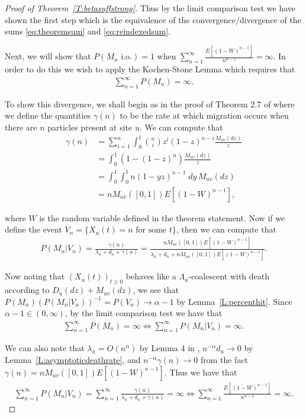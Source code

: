 \documentclass[11pt]{article}
\theoremstyle{definition}
\newcommand{\thmref}[1]{Theorem~\ref{T:#1}}
\newcommand{\lemref}[1]{Lemma~\ref{L:#1}}
\begin{document}
\begin{proof}[Proof of \thmref{betasuffstrong}]
    \noindent Thus by the limit comparison test we have shown the first step which is the equivalence of the convergence/divergence of the sums \eqref{eq:theoremsum} and \eqref{eq:reindexedsum}.
    \medskip
 
    \noindent Next, we will show that $P(M_n \text{ i.o.}) = 1$ when $\sum_{n=1}^\infty \frac{E[(1-W)^{n-1}]}{n^{\alpha-1}} = \infty$. In order to do this we wish to apply the Kochen-Stone Lemma which requires that
    \begin{align}\label{eq:kochencond}
        \sum_{n = 1}^\infty P(M_n) = \infty.
    \end{align}

    \noindent To show this divergence, we shall begin as in the proof of Theorem 2.7 of \cite{seedbank2} where we define the quantities $\gamma(n)$ to be the rate at which migration occurs when there are $n$ particles present at site $u$. We can compute that
    \begin{align*}
        \gamma(n) &= \sum_{i = 1}^n\int_0^1 \binom{n}{i}z^i(1-z)^{n-i} \frac{M_{uv}(dz)}{z}\\
        &= \int_0^1 (1- (1-z)^n)\frac{M_{uv}(dz)}{z}\\
        &= \int_0^1 \int_0^1 n(1-yz)^{n-1}\;dy\,M_{uv}(dz)\\
        &= n M_{uv}([0,1])E[(1-W)^{n-1}],
    \end{align*}

    \noindent where $W$ is the random variable defined in the theorem statement. Now if we define the event $V_n = \{X_u(t) = n \text{ for some } t\}$, then we can compute that
    \begin{align*}
        P(M_n|V_n) = \frac{\gamma(n)}{\lambda_n + d_n + \gamma(n)} = \frac{n M_{uv}([0,1])E[(1-W)^{n-1}]}{\lambda_n + d_n + n M_{uv}([0,1])E[(1-W)^{n-1}]}.
    \end{align*}

    \noindent Now noting that $(X_u(t))_{t \geq 0}$ behaves like a $\Lambda_u$-coalescent with death according to $D_u(dz) + M_{uv}(dz)$, we see that $P(M_n)(P(M_n|V_n))^{-1} = P(V_n) \to \alpha - 1$ by \lemref{percenthit}. Since $\alpha -1 \in (0,\infty)$, by the limit comparison test we have that
    \begin{align*}
        \sum_{n = 1}^\infty P(M_n) = \infty \iff \sum_{n = 1}^\infty P(M_n|V_n) = \infty. 
    \end{align*}

    \noindent We can also note that $\lambda_n = O(n^\alpha)$ by Lemma 4 in \cite{stochasticflows3}, $n^{-\alpha}d_n \to 0$ by \lemref{asymptoticdeathrate}, and $n^{-\alpha}\gamma(n) \to 0$ from the fact $\gamma(n) = n M_{uv}([0,1])E[(1-W)^{n-1}]$. Thus we have that
    \begin{align*}
        \sum_{n = 1}^\infty P(M_n|V_n) = \sum_{n = 1}^\infty \frac{\gamma(n)}{\lambda_n + d_n + \gamma(n)} = \infty \iff \sum_{n=1}^\infty \frac{E[(1-W)^{n-1}]}{n^{\alpha-1}} = \infty.
    \end{align*}


\end{proof}
\end{document}
